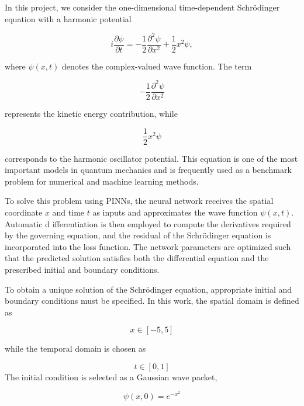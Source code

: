 \documentclass[11pt]{article}
\begin{document}
In this project, we consider the one-dimensional time-dependent 
Schrödinger equation with a harmonic potential

\begin{equation}
i\frac{\partial \psi}{\partial t}
=
-\frac{1}{2}\frac{\partial^2 \psi}{\partial x^2}
+
\frac{1}{2}x^2\psi,
\end{equation}

where $\psi(x,t)$ denotes the complex-valued wave function. The term

\begin{equation}
-\frac{1}{2}\frac{\partial^2 \psi}{\partial x^2}
\end{equation}

represents the kinetic energy contribution, while

\begin{equation}
\frac{1}{2}x^2\psi
\end{equation}

corresponds to the harmonic oscillator potential. 
This equation is one of the most important models in 
quantum mechanics and is frequently used as a benchmark 
problem for numerical and machine learning methods.

To solve this problem using PINNs, the neural 
network receives the spatial coordinate 
$x$ and time $t$ as inputs and approximates 
the wave function $\psi(x,t)$. Automatic d
ifferentiation is then employed to compute 
the derivatives required by the governing equation, 
and the residual of the Schrödinger equation is 
incorporated into the loss function. The network 
parameters are optimized such that the predicted 
solution satisfies both the differential equation 
and the prescribed initial and boundary conditions.


To obtain a unique solution of the Schrödinger equation, 
appropriate initial and boundary conditions must be specified.
In this work, the spatial domain is defined as

\begin{equation}
    x \in [-5,5]
\end{equation}


while the temporal domain is chosen as

\begin{equation}
    t \in [0,1]
\end{equation}
The initial condition is selected as a Gaussian wave packet,

\begin{equation}
    \psi(x,0)=e^{-x^2}
\end{equation}
\end{document}
